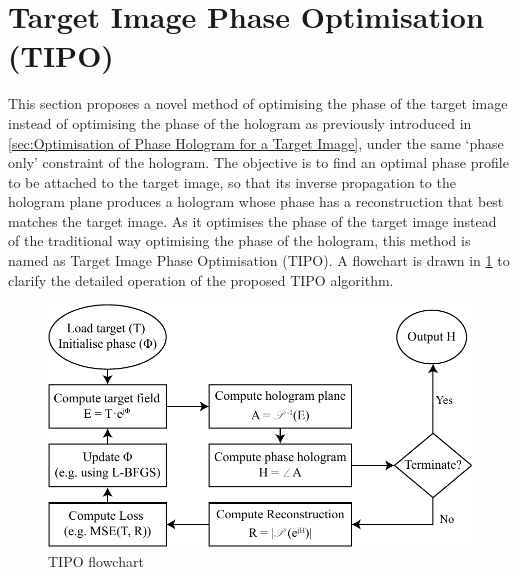 \section{Target Image Phase Optimisation (TIPO)}
This section proposes a novel method of optimising the phase of the target image instead of optimising the phase of the hologram as previously introduced in \cref{sec:Optimisation of Phase Hologram for a Target Image}, under the same `phase only' constraint of the hologram. The objective is to find an optimal phase profile to be attached to the target image, so that its inverse propagation to the hologram plane produces a hologram whose phase has a reconstruction that best matches the target image. As it optimises the phase of the target image instead of the traditional way optimising the phase of the hologram, this method is named as Target Image Phase Optimisation (TIPO). A flowchart is drawn in \cref{fig:TIPO_flowchart} to clarify the detailed operation of the proposed TIPO algorithm.

\begin{figure}[H]
	\centering
	\includegraphics[width=\textwidth]{TIPO_flowchart.pdf}
	\caption{TIPO flowchart}
	\label{fig:TIPO_flowchart}
\end{figure}

